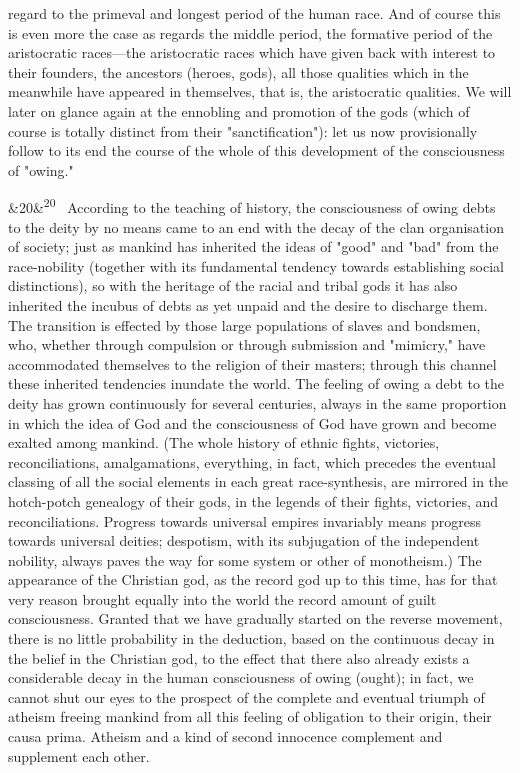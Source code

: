 \documentclass[12pt]{article}
\newcommand{\para}[1][]{\par\noindent\ifx&#1&\else\textsuperscript{\footnotesize #1}~\fi}
\begin{document}
regard to the primeval and longest period of the human race. And of course this is even more the case as regards the middle period, the formative period of the aristocratic races---the aristocratic races which have given back with interest to their founders, the ancestors (heroes, gods), all those qualities which in the meanwhile have appeared in themselves, that is, the aristocratic qualities. We will later on glance again at the ennobling and promotion of the gods (which of course is totally distinct from their "sanctification"): let us now provisionally follow to its end the course of the whole of this development of the consciousness of "owing."

\para[20] According to the teaching of history, the consciousness of owing debts to the deity by no means came to an end with the decay of the clan organisation of society; just as mankind has inherited the ideas of "good" and "bad" from the race-nobility (together with its fundamental tendency towards establishing social distinctions), so with the heritage of the racial and tribal gods it has also inherited the incubus of debts as yet unpaid and the desire to discharge them. The transition is effected by those large populations of slaves and bondsmen, who, whether through compulsion or through submission and "mimicry," have accommodated themselves to the religion of their masters; through this channel these inherited tendencies inundate the world. The feeling of owing a debt to the deity has grown continuously for several centuries, always in the same proportion in which the idea of God and the consciousness of God have grown and become exalted among mankind. (The whole history of ethnic fights, victories, reconciliations, amalgamations, everything, in fact, which precedes the eventual classing of all the social elements in each great race-synthesis, are mirrored in the hotch-potch genealogy of their gods, in the legends of their fights, victories, and reconciliations. Progress towards universal empires invariably means progress towards universal deities; despotism, with its subjugation of the independent nobility, always paves the way for some system or other of monotheism.) The appearance of the Christian god, as the record god up to this time, has for that very reason brought equally into the world the record amount of guilt consciousness. Granted that we have gradually started on the reverse movement, there is no little probability in the deduction, based on the continuous decay in the belief in the Christian god, to the effect that there also already exists a considerable decay in the human consciousness of owing (ought); in fact, we cannot shut our eyes to the prospect of the complete and eventual triumph of atheism freeing mankind from all this feeling of obligation to their origin, their causa prima. Atheism and a kind of second innocence complement and supplement each other.
\end{document}
